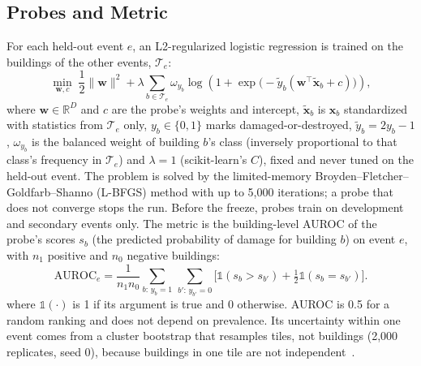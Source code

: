 \documentclass[journal]{IEEEtran}
\begin{document}
\subsection{Probes and Metric}
For each held-out event $e$, an L2-regularized logistic regression is trained on the buildings of the other events, $\mathcal{T}_e$:
\begin{equation}
\min_{\mathbf{w},c}\;\frac{1}{2}\|\mathbf{w}\|^2+\lambda\sum_{b\in\mathcal{T}_e}\omega_{y_b}\log\!\left(1+\exp\!\big(-\tilde y_b(\mathbf{w}^{\top}\tilde{\mathbf{x}}_b+c)\big)\right),
\label{eq:probe}
\end{equation}
where $\mathbf{w}\in\mathbb{R}^{D}$ and $c$ are the probe's weights and intercept, $\tilde{\mathbf{x}}_b$ is $\mathbf{x}_b$ standardized with statistics from $\mathcal{T}_e$ only, $y_b\in\{0,1\}$ marks damaged-or-destroyed, $\tilde y_b=2y_b-1$, $\omega_{y_b}$ is the balanced weight of building $b$'s class (inversely proportional to that class's frequency in $\mathcal{T}_e$) and $\lambda=1$ (scikit-learn's $C$), fixed and never tuned on the held-out event. The problem is solved by the limited-memory Broyden--Fletcher--Goldfarb--Shanno (L-BFGS) method with up to 5,000 iterations; a probe that does not converge stops the run. Before the freeze, probes train on development and secondary events only. The metric is the building-level AUROC of the probe's scores $s_b$ (the predicted probability of damage for building $b$) on event $e$, with $n_1$ positive and $n_0$ negative buildings:
\begin{equation}
\mathrm{AUROC}_e=\frac{1}{n_1n_0}\!\sum_{b:\,y_b=1}\,\sum_{b':\,y_{b'}=0}\!\big[\mathbb{1}(s_b{>}s_{b'})+\tfrac{1}{2}\mathbb{1}(s_b{=}s_{b'})\big].
\label{eq:auroc}
\end{equation}
where $\mathbb{1}(\cdot)$ is 1 if its argument is true and 0 otherwise. AUROC is 0.5 for a random ranking and does not depend on prevalence. Its uncertainty within one event comes from a cluster bootstrap that resamples tiles, not buildings (2,000 replicates, seed 0), because buildings in one tile are not independent~\cite{field2007bootstrap}.
\end{document}
